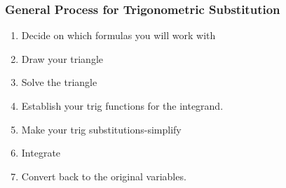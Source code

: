 \begin{frame}
\frametitle{General Process for Trigonometric Substitution}

\begin{enumerate}
\item Decide on which formulas you will work with
\item Draw your triangle
\item Solve the triangle
 \item Establish your trig functions for the integrand.
\item Make your trig substitutions-simplify
\item Integrate
\item Convert back to the original variables.
\end{enumerate}
\end{frame}
